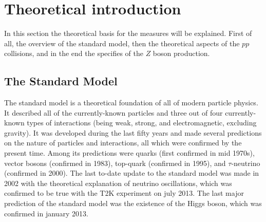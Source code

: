 \chapter{Theoretical introduction}
\label{sec:Theory}

In this section the theoretical basis for the measures will be explained. First of all, the overview of the standard model, then the theoretical aspects of the $pp$ collisions, and in the end the specifies of the $Z$ boson production.

\section{The Standard Model}
\label{sec:theory_SM}

The standard model is a theoretical foundation of all of modern particle physics. It described all of the currently-known particles and three out of four currently-known types of interactions (being weak, strong, and electromagnetic, excluding gravity). It was developed during the last fifty years and made several predictions on the nature of particles and interactions, all which were confirmed by the present time. Among its predictions were quarks (first confirmed in mid 1970s), vector bosons (confirmed in 1983), top-quark (confirmed in 1995), and $\tau$-neutrino (confirmed in 2000). The last to-date update to the standard model was made in 2002 with the theoretical explanation of neutrino oscillations, which was confirmed to be true with the T2K experiment on july 2013. The last major prediction of the standard model was the existence of the Higgs boson, which was confirmed in january 2013.

